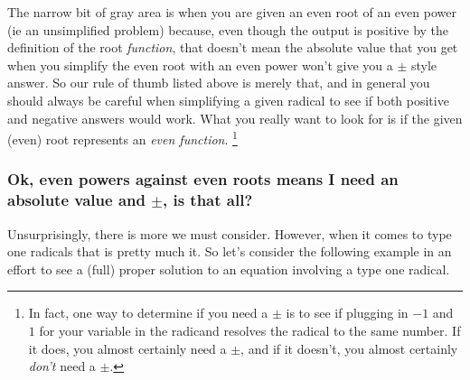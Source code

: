     The narrow bit of gray area is when you are given an even root of an even power (ie an unsimplified problem) because, even though the output is positive by the definition of the root \textit{function}, that doesn't mean the absolute value that you get when you simplify the even root with an even power won't give you a $\pm$ style answer. So our rule of thumb listed above is merely that, and in general you should always be careful when simplifying a given radical to see if both positive and negative answers would work. What you really want to look for is if the given (even) root represents an \textit{even function}.%
    \footnote{In fact, one way to determine if you need a $\pm$ is to see if plugging in $-1$ and $1$ for your variable in the radicand resolves the radical to the same number. If it does, you almost certainly need a $\pm$, and if it doesn't, you almost certainly \textit{don't} need a $\pm$.}

\subsubsection*{Ok, even powers against even roots means I need an absolute value and $\pm$, is that all?}

    Unsurprisingly, there is more we must consider. However, when it comes to type one radicals that is pretty much it. So let's consider the following example in an effort to see a (full) proper solution to an equation involving a type one radical.


